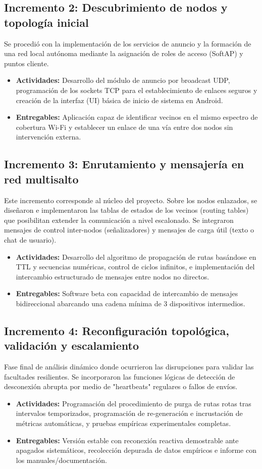 \documentclass[12pt,oneside]{scrreprt}
\begin{document}
\subsection{Incremento 2: Descubrimiento de nodos y topología inicial}
Se procedió con la implementación de los servicios de anuncio y la formación de una red local autónoma mediante la asignación de roles de acceso (SoftAP) y puntos cliente.
\begin{itemize}
    \item \textbf{Actividades:} Desarrollo del módulo de anuncio por broadcast UDP, programación de los sockets TCP para el establecimiento de enlaces seguros y creación de la interfaz (UI) básica de inicio de sistema en Android.
    \item \textbf{Entregables:} Aplicación capaz de identificar vecinos en el mismo espectro de cobertura Wi-Fi y establecer un enlace de una vía entre dos nodos sin intervención externa.
\end{itemize}

\subsection{Incremento 3: Enrutamiento y mensajería en red multisalto}
Este incremento corresponde al núcleo del proyecto. Sobre los nodos enlazados, se diseñaron e implementaron las tablas de estados de los vecinos (routing tables) que posibilitan extender la comunicación a nivel escalonado. Se integraron mensajes de control inter-nodos (señalizadores) y mensajes de carga útil (texto o chat de usuario).
\begin{itemize}
    \item \textbf{Actividades:} Desarrollo del algoritmo de propagación de rutas basándose en TTL y secuencias numéricas, control de ciclos infinitos, e implementación del intercambio estructurado de mensajes entre nodos no directos.
    \item \textbf{Entregables:} Software beta con capacidad de intercambio de mensajes bidireccional abarcando una cadena mínima de 3 dispositivos intermedios.
\end{itemize}

\subsection{Incremento 4: Reconfiguración topológica, validación y escalamiento}
Fase final de análisis dinámico donde ocurrieron las disrupciones para validar las facultades resilientes. Se incorporaron las funciones lógicas de detección de desconexión abrupta por medio de "heartbeats" regulares o fallos de envíos.
\begin{itemize}
    \item \textbf{Actividades:} Programación del procedimiento de purga de rutas rotas tras intervalos temporizados, programación de re-generación e incrustación de métricas automáticas, y pruebas empíricas experimentales completas.
    \item \textbf{Entregables:} Versión estable con reconexión reactiva demostrable ante apagados sistemáticos, recolección depurada de datos empíricos e informe con los manuales/documentación.
\end{itemize}
\end{document}
